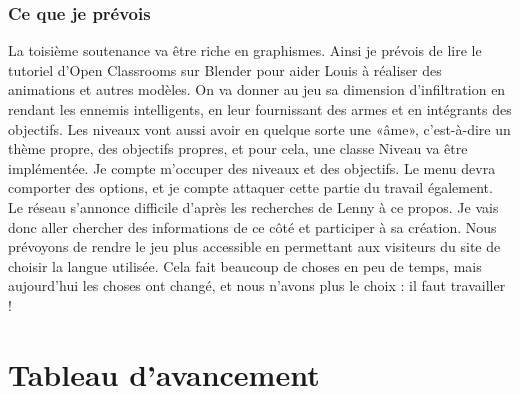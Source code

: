 \documentclass{article}
\begin{document}
\subsubsection{Ce que je prévois}
La toisième soutenance va être riche en graphismes. Ainsi je prévois de lire le tutoriel d’Open Classrooms sur Blender pour aider Louis à réaliser des animations et autres modèles. On va donner au jeu sa dimension d’infiltration en rendant les ennemis intelligents, en leur fournissant des armes et en intégrants des objectifs. Les niveaux vont aussi avoir en quelque sorte une «âme», c’est-à-dire un thème propre, des objectifs propres, et pour cela, une classe Niveau va être implémentée. Je compte m’occuper des niveaux et des objectifs. Le menu devra comporter des options, et je compte attaquer cette partie du travail également. Le réseau s’annonce difficile d’après les recherches de Lenny à ce propos. Je vais donc aller chercher des informations de ce côté et participer à sa création. Nous prévoyons de rendre le jeu plus accessible en permettant aux visiteurs du site de choisir la langue utilisée. Cela fait beaucoup de choses en peu de temps, mais aujourd’hui les choses ont changé, et nous n’avons plus le choix : il faut travailler !


\newpage





\section{Tableau d'avancement}
\end{document}
